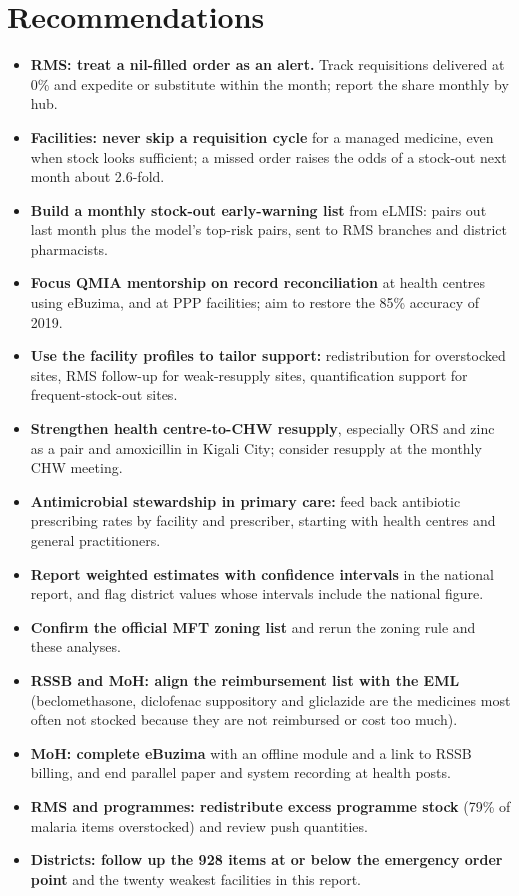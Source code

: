 \documentclass[10pt,a4paper]{report}
\begin{document}
\chapter{Recommendations}
\begin{itemize}\item \textbf{RMS: treat a nil-filled order as an alert.} Track requisitions delivered at 0\% and expedite or substitute within the month; report the share monthly by hub.
\item \textbf{Facilities: never skip a requisition cycle} for a managed medicine, even when stock looks sufficient; a missed order raises the odds of a stock-out next month about 2.6-fold.
\item \textbf{Build a monthly stock-out early-warning list} from eLMIS: pairs out last month plus the model's top-risk pairs, sent to RMS branches and district pharmacists.
\item \textbf{Focus QMIA mentorship on record reconciliation} at health centres using eBuzima, and at PPP facilities; aim to restore the 85\% accuracy of 2019.
\item \textbf{Use the facility profiles to tailor support:} redistribution for overstocked sites, RMS follow-up for weak-resupply sites, quantification support for frequent-stock-out sites.
\item \textbf{Strengthen health centre-to-CHW resupply}, especially ORS and zinc as a pair and amoxicillin in Kigali City; consider resupply at the monthly CHW meeting.
\item \textbf{Antimicrobial stewardship in primary care:} feed back antibiotic prescribing rates by facility and prescriber, starting with health centres and general practitioners.
\item \textbf{Report weighted estimates with confidence intervals} in the national report, and flag district values whose intervals include the national figure.
\item \textbf{Confirm the official MFT zoning list} and rerun the zoning rule and these analyses.
\end{itemize}
\begin{itemize}\item \textbf{RSSB and MoH: align the reimbursement list with the EML} (beclomethasone, diclofenac suppository and gliclazide are the medicines most often not stocked because they are not reimbursed or cost too much).
\item \textbf{MoH: complete eBuzima} with an offline module and a link to RSSB billing, and end parallel paper and system recording at health posts.
\item \textbf{RMS and programmes: redistribute excess programme stock} (79\% of malaria items overstocked) and review push quantities.
\item \textbf{Districts: follow up the 928 items at or below the emergency order point} and the twenty weakest facilities in this report.
\end{itemize}
\end{document}
